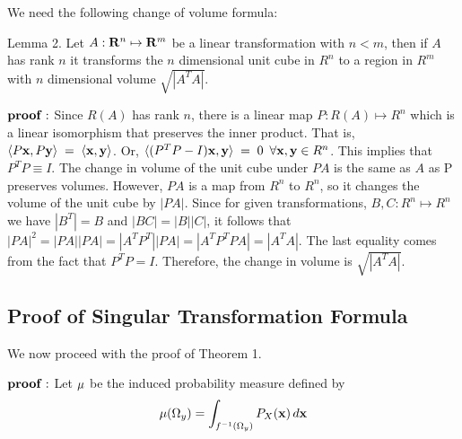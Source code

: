 \bigskip

We need the following change of volume formula:

\proclaim Lemma 2. Let 
$A : {\bf R}^n \mapsto {\bf R}^m$ be a linear 
transformation with $n < m$, then if $A$ has rank $n$ it transforms the 
$n$ dimensional unit cube in $R^n$ to a region in $R^m$ with 
$n$ dimensional volume 
$\sqrt{ |A^T A|}$.

${\bf proof:}$ Since $R(A)$ has rank $n$, there is a linear map 
$P: R(A) \mapsto R^n$ which is a linear isomorphism that preserves the 
inner product. That is, $\langle P {\bf x}, P{\bf y}\rangle \; = \; \langle{\bf x}, {\bf y}\rangle$. Or,
$\langle(P^TP  - I){\bf x}, {\bf y}\rangle \; = \; 0 \enspace \forall {\bf x}, {\bf y} \in R^n$. 
This implies that $P^TP \equiv I$. The change in volume of the 
unit cube under $PA$ is the same as $A$ as P preserves volumes. However,
$PA$ is a map from $R^n$ to $R^n$, so it changes the volume of the unit cube
by $|PA|$. Since for given transformations, $B, C: R^n \mapsto R^n$ we have 
$|B^T| = B$ and $|BC| = |B| |C|$, it follows that 
$|PA|^2 = |PA| |PA| = |A^TP^T| |PA| = |A^TP^T P A| = |A^TA|$. The last 
equality comes from the fact that $P^TP = I$.
Therefore, the change in volume is $\sqrt{|A^TA|}$.

\bigskip

\subsection{Proof of Singular Transformation Formula}

We now proceed with the proof of Theorem 1.
\smallskip

${\bf proof:}$ Let ${\bf \mu}$ be the induced probability measure defined by%
$$
{\bf \mu}(\Omega_y) = \int_{f^{-1}(\Omega_y)} P_X({\bf x}) \, d{\bf x}
$$

